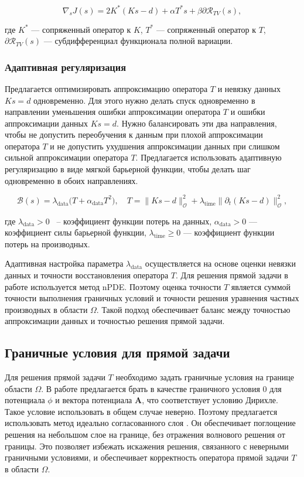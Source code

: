 \documentclass[a4paper,14pt,oneside,openany]{extarticle}
\begin{document}
\begin{equation}
    \nabla_s J(s) = 2K^*(Ks - d) + \alpha T^* s + \beta \partial \mathcal{R}_{TV}(s),
\end{equation}

где $K^*$ --- сопряженный оператор к $K$, $T^*$ --- сопряженный оператор к $T$, $\partial 
\mathcal{R}_{TV}(s)$ --- субдифференциал функционала полной вариации.


\subsubsection{Адаптивная регуляризация}

Предлагается оптимизировать аппроксимацию оператора $T$ и невязку данных $Ks = d$ одновременно. 
Для этого нужно делать спуск одновременно
в направлении уменьшения ошибки аппроксимации оператора $T$ и ошибки аппроксимации данных $Ks = d$. 
Нужно балансировать эти два направления, 
чтобы не допустить переобучения к данным при плохой аппроксимации оператора $T$ и не допустить 
ухудшения аппроксимации данных при слишком сильной аппроксимации оператора $T$.
Предлагается использовать адаптивную регуляризацию в виде мягкой барьерной функции, чтобы делать 
шаг одновременно в обоих направлениях.

\begin{equation}
    \mathcal{B}(s) = \lambda_{\mathrm{data}} \bigl(T + \alpha_{\mathrm{data}} T^2\bigr),
    \quad T = \|Ks - d\|_{\mathcal{O}}^2 + 
    \lambda_{\mathrm{time}} \|\partial_t (Ks - d)\|_{\mathcal{O}}^2,
\end{equation}

где $\lambda_{\mathrm{data}} > 0$ ~-- коэффициент функции потерь на данных, 
$\alpha_{\mathrm{data}} > 0$ --- коэффициент силы барьерной функции, 
$\lambda_{\mathrm{time}} \geq 0$ --- коэффициент функции потерь на производных.

Адаптивная настройка параметра $\lambda_{\mathrm{data}}$ осуществляется на основе оценки 
невязки данных и точности восстановления оператора $T$.
Для решения прямой задачи в работе используется метод nPDE. Поэтому оценка точности
 $T$ является суммой точности выполнения граничных условий и
точности решения уравнения частных производных в области $\Omega$.
Такой подход обеспечивает баланс между точностью аппроксимации данных и точностью 
решения прямой задачи.

\subsection{Граничные условия для прямой задачи}
Для решения прямой задачи $T$ необходимо задать граничные условия на границе области $\Omega$.
В работе предлагается брать в качестве граничного условия $0$ для потенциала $\phi$ и 
вектора потенциала $\mathbf{A}$, что соответствует условию Дирихле.
Такое условие использовать в общем случае неверно. Поэтому предлагается 
использовать метод идеально согласованного слоя \cite{Becache2004}. Он обеспечивает
поглощение решения на небольшом слое на границе, без отражения волнового решения от границы. 
Это позволяет избежать искажения решения, связанного с неверными 
граничными условиями, и обеспечивает корректность оператора прямой задачи $T$ в области $\Omega$.
\end{document}

